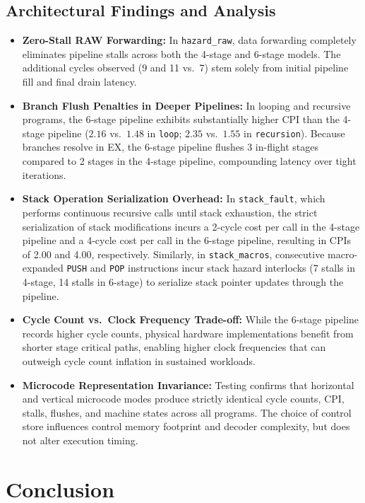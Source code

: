 \documentclass[11pt,a4paper]{article}
\begin{document}
\subsection{Architectural Findings and Analysis}
\begin{itemize}
    \item \textbf{Zero-Stall RAW Forwarding:} In \texttt{hazard\_raw}, data forwarding completely eliminates pipeline stalls across both the 4-stage and 6-stage models. The additional cycles observed (9 and 11 vs.\ 7) stem solely from initial pipeline fill and final drain latency.
    \item \textbf{Branch Flush Penalties in Deeper Pipelines:} In looping and recursive programs, the 6-stage pipeline exhibits substantially higher CPI than the 4-stage pipeline ($2.16$ vs.\ $1.48$ in \texttt{loop}; $2.35$ vs.\ $1.55$ in \texttt{recursion}). Because branches resolve in EX, the 6-stage pipeline flushes 3 in-flight stages compared to 2 stages in the 4-stage pipeline, compounding latency over tight iterations.
    \item \textbf{Stack Operation Serialization Overhead:} In \texttt{stack\_fault}, which performs continuous recursive calls until stack exhaustion, the strict serialization of stack modifications incurs a 2-cycle cost per call in the 4-stage pipeline and a 4-cycle cost per call in the 6-stage pipeline, resulting in CPIs of 2.00 and 4.00, respectively. Similarly, in \texttt{stack\_macros}, consecutive macro-expanded \texttt{PUSH} and \texttt{POP} instructions incur stack hazard interlocks (7 stalls in 4-stage, 14 stalls in 6-stage) to serialize stack pointer updates through the pipeline.
    \item \textbf{Cycle Count vs.\ Clock Frequency Trade-off:} While the 6-stage pipeline records higher cycle counts, physical hardware implementations benefit from shorter stage critical paths, enabling higher clock frequencies that can outweigh cycle count inflation in sustained workloads.
    \item \textbf{Microcode Representation Invariance:} Testing confirms that horizontal and vertical microcode modes produce strictly identical cycle counts, CPI, stalls, flushes, and machine states across all programs. The choice of control store influences control memory footprint and decoder complexity, but does not alter execution timing.
\end{itemize}

\section{Conclusion}
\end{document}

